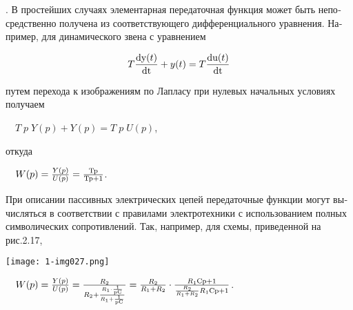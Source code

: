 \documentclass[a4paper]{article}
\newcommand\normalsubformula[1]{\text{\mathversion{normal}$#1$}}
\begin{document}
{\begin{russian}. В простейших случаях элементарная передаточная функция может быть непосредственно получена из соответствующего
дифференци­аль­но­го уравнения. Например, для динамического звена с уравнением
\end{russian}}

\begin{equation*}
T\frac{\normalsubformula{\text{dy}}(t)}{\normalsubformula{\text{dt}}}+y(t)=T\frac{\normalsubformula{\text{du}}(t)}{\normalsubformula{\text{dt}}}
\end{equation*}
{\begin{russian}\sffamily
путем перехода к изображениям по Лапласу при нулевых начальных условиях получаем
\end{russian}}

{\begin{russian}\sffamily
\ \  $T\;p\;Y(p)+Y(p)=T\;p\;U(p)$,\ \ 
\end{russian}}

{\begin{russian}\sffamily
откуда
\end{russian}}


\bigskip


\bigskip

{\begin{russian}\sffamily
\ \  $W(p)=\frac{Y(p)}{U(p)}=\frac{\normalsubformula{\text{Tp}}}{\normalsubformula{\text{Tp}}+1}$.
\end{russian}}

{\begin{russian}\sffamily
При описании пассивных электрических цепей передаточные функции могут вычисляться в соответствии с правилами
электротехники с использованием полных символических сопротивлений. Так, например, для схемы, приведенной на рис.2.17,
\end{russian}}

{\centering  \texttt{[image: 1-img027.png]} \par}

\bigskip

{\begin{russian}\sffamily
\ \  $W(p)=\frac{Y(p)}{U(p)}=\frac{R_2}{R_2+\frac{R_1\cdot \frac 1{\normalsubformula{\text{pC}}}}{R_1+\frac
1{\normalsubformula{\text{pC}}}}}=\frac{R_2}{R_1+R_2}\cdot
\frac{R_1\normalsubformula{\text{Cp}}+1}{\frac{R_2}{R_1+R_2}R_1\normalsubformula{\text{Cp}}+1}$.
\end{russian}}
\end{document}
